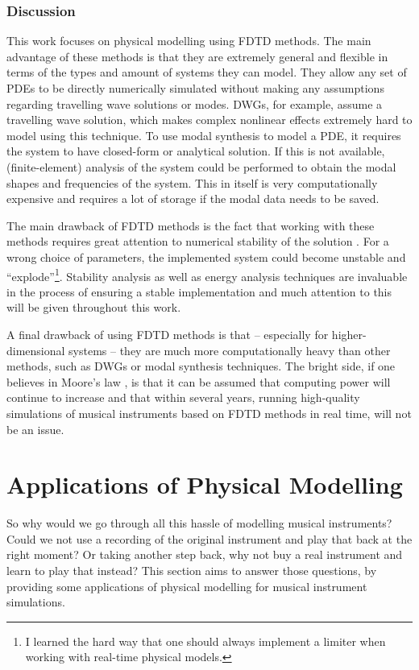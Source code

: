\subsubsection{Discussion}
This work focuses on physical modelling using FDTD methods. The main advantage of these methods is that they are extremely general and flexible in terms of the types and amount of systems they can model. They allow any set of PDEs to be directly numerically simulated without making any assumptions regarding travelling wave solutions or modes. DWGs, for example, assume a travelling wave solution, which makes complex nonlinear effects extremely hard to model using this technique. To use modal synthesis to model a PDE, it requires the system to have closed-form or analytical solution. If this is not available, (finite-element) analysis of the system could be performed to obtain the modal shapes and frequencies of the system. This in itself is very computationally expensive and requires a lot of storage if the modal data needs to be saved. 
 

The main drawback of FDTD methods is the fact that working with these methods requires great attention to numerical stability of the solution \cite{theBible}. For a wrong choice of parameters, the implemented system could become unstable and ``explode''\footnote{I learned the hard way that one should always implement a limiter when working with real-time physical models.}. Stability analysis as well as energy analysis techniques are invaluable in the process of ensuring a stable implementation and much attention to this will be given throughout this work.

A final drawback of using FDTD methods is that -- especially for higher-dimensional systems -- they are much more computationally heavy than other methods, such as DWGs or modal synthesis techniques. The bright side, if one believes in Moore's law \cite{Moore1965}, is that it can be assumed that computing power will continue to increase and that within several years, running high-quality simulations of musical instruments based on FDTD methods in real time, will not be an issue.

\section{Applications of Physical Modelling}\label{sec:why}
So why would we go through all this hassle of modelling musical instruments? Could we not use a recording of the original instrument and play that back at the right moment? Or taking another step back, why not buy a real instrument and learn to play that instead? This section aims to answer those questions, by providing some applications of physical modelling for musical instrument simulations. 

